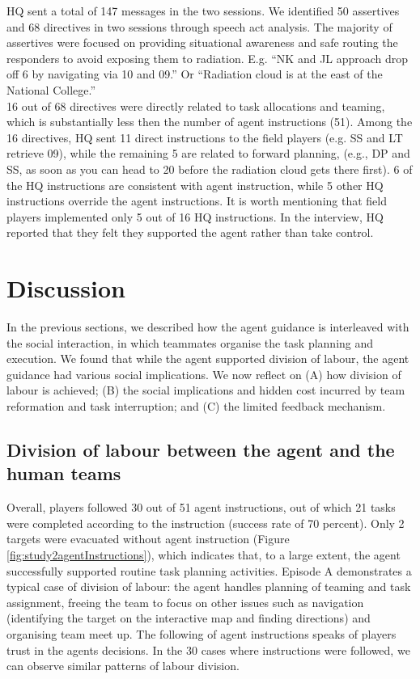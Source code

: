 HQ sent a total of 147 messages in the two sessions. We identified 50 assertives and 68 directives in two sessions through speech act analysis. The majority of assertives were focused on providing situational awareness and safe routing the responders to avoid exposing them to radiation. E.g. ``NK and JL approach drop off 6 by navigating via 10 and 09.'' Or ``Radiation cloud is at the east of the National College.''\\

16 out of 68 directives were directly related to task allocations and teaming, which is substantially less then the number of agent instructions (51). Among the 16 directives, HQ sent 11 direct instructions to the field players (e.g. SS and LT retrieve 09), while the remaining 5 are related to forward planning, (e.g., DP and SS, as soon as you can head to 20 before the radiation cloud gets there first). 6 of the HQ instructions are consistent with agent instruction, while 5 other HQ instructions override the agent instructions. It is worth mentioning that field players implemented only 5 out of 16 HQ instructions. In the interview, HQ reported that they felt they supported the agent rather than take control. 

\section{Discussion}
In the previous sections, we described how the agent guidance is interleaved with the social interaction, in which teammates organise the task planning and execution. We found that while the agent supported division of labour, the agent guidance had various social implications. We now reflect on (A) how division of labour is achieved; (B) the social implications and hidden cost incurred by team reformation and task interruption; and (C) the limited feedback mechanism. \\

\subsection{Division of labour between the agent and the human teams}
Overall, players followed 30 out of 51 agent instructions, out of which 21 tasks were completed according to the instruction (success rate of 70 percent). Only 2 targets were evacuated without agent instruction (Figure \ref{fig:study2agentInstructions}), which indicates that, to a large extent, the agent successfully supported routine task planning activities. Episode A demonstrates a typical case of division of labour: the agent handles planning of teaming and task assignment, freeing the team to focus on other issues such as navigation (identifying the target on the interactive map and finding directions) and organising team meet up. The following of agent instructions speaks of players trust in the agents decisions. In the 30 cases where instructions were followed, we can observe similar patterns of labour division.\\


